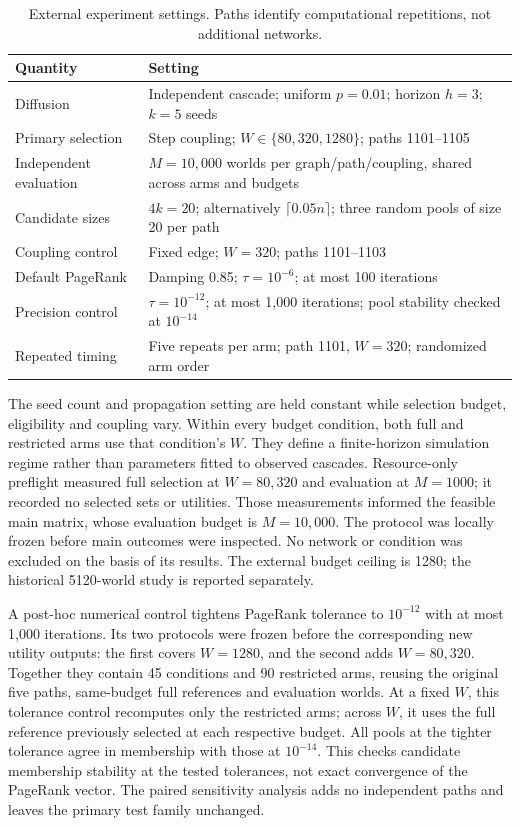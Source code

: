 \documentclass[smallextended]{svjour3}
\begin{document}
\begin{table}[htbp]
\caption{External experiment settings. Paths identify computational repetitions, not additional networks.}\label{tab:settings}
\begin{tabularx}{\linewidth}{lX}
\toprule
Quantity & Setting \\
\midrule
Diffusion & Independent cascade; uniform $p=0.01$; horizon $h=3$; $k=5$ seeds \\
Primary selection & Step coupling; $W\in\{80,320,1280\}$; paths 1101--1105 \\
Independent evaluation & $M=10,000$ worlds per graph/path/coupling, shared across arms and budgets \\
Candidate sizes & $4k=20$; alternatively $\lceil0.05n\rceil$; three random pools of size 20 per path \\
Coupling control & Fixed edge; $W=320$; paths 1101--1103 \\
Default PageRank & Damping 0.85; $\tau=10^{-6}$; at most 100 iterations \\
Precision control & $\tau=10^{-12}$; at most 1,000 iterations; pool stability checked at $10^{-14}$ \\
Repeated timing & Five repeats per arm; path 1101, $W=320$; randomized arm order \\
\bottomrule
\end{tabularx}
\end{table}

The seed count and propagation setting are held constant while selection budget, eligibility and coupling vary. Within every budget condition, both full and restricted arms use that condition's $W$. They define a finite-horizon simulation regime rather than parameters fitted to observed cascades. Resource-only preflight measured full selection at $W=80,320$ and evaluation at $M=1000$; it recorded no selected sets or utilities. Those measurements informed the feasible main matrix, whose evaluation budget is $M=10,000$. The protocol was locally frozen before main outcomes were inspected. No network or condition was excluded on the basis of its results. The external budget ceiling is 1280; the historical 5120-world study is reported separately.

A post-hoc numerical control tightens PageRank tolerance to $10^{-12}$ with at most 1,000 iterations. Its two protocols were frozen before the corresponding new utility outputs: the first covers $W=1280$, and the second adds $W=80,320$. Together they contain 45 conditions and 90 restricted arms, reusing the original five paths, same-budget full references and evaluation worlds. At a fixed $W$, this tolerance control recomputes only the restricted arms; across $W$, it uses the full reference previously selected at each respective budget. All pools at the tighter tolerance agree in membership with those at $10^{-14}$. This checks candidate membership stability at the tested tolerances, not exact convergence of the PageRank vector. The paired sensitivity analysis adds no independent paths and leaves the primary test family unchanged.
\end{document}

